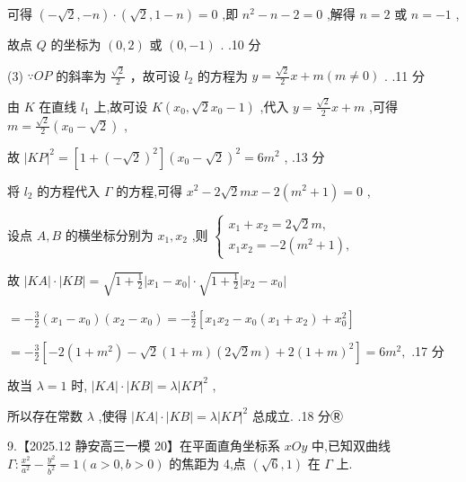 \documentclass[10pt]{article}
\begin{document}
可得 \(\left( {-\sqrt{2}, - n}\right)  \cdot  \left( {\sqrt{2},1 - n}\right)  = 0\) ,即 \({n}^{2} - n - 2 = 0\) ,解得 \(n = 2\) 或 \(n =  - 1\) ,

故点 \(Q\) 的坐标为 \(\left( {0,2}\right)\) 或 \(\left( {0, - 1}\right)\) . .10 分

(3) \(\because {OP}\) 的斜率为 \(\frac{\sqrt{2}}{2}\) ，故可设 \({l}_{2}\) 的方程为 \(y = \frac{\sqrt{2}}{2}x + m\left( {m \neq  0}\right)\) . .11 分

由 \(K\) 在直线 \({l}_{1}\) 上,故可设 \(K\left( {{x}_{0},\sqrt{2}{x}_{0} - 1}\right)\) ,代入 \(y = \frac{\sqrt{2}}{2}x + m\) ,可得 \(m = \frac{\sqrt{2}}{2}\left( {{x}_{0} - \sqrt{2}}\right)\) ,

故 \({\left| KP\right| }^{2} = \left\lbrack  {1 + {\left( -\sqrt{2}\right) }^{2}}\right\rbrack  {\left( {x}_{0} - \sqrt{2}\right) }^{2} = 6{m}^{2}\) , .13 分

将 \({l}_{2}\) 的方程代入 \(\Gamma\) 的方程,可得 \({x}^{2} - 2\sqrt{2}{mx} - 2\left( {{m}^{2} + 1}\right)  = 0\) ,

设点 \(A,B\) 的横坐标分别为 \({x}_{1},{x}_{2}\) ,则 \(\left\{  \begin{matrix} {x}_{1} + {x}_{2} = 2\sqrt{2}m, \\  {x}_{1}{x}_{2} =  - 2\left( {{m}^{2} + 1}\right) , \end{matrix}\right.\)

故 \(\left| {KA}\right|  \cdot  \left| {KB}\right|  = \sqrt{1 + \frac{1}{2}}\left| {{x}_{1} - {x}_{0}}\right|  \cdot  \sqrt{1 + \frac{1}{2}}\left| {{x}_{2} - {x}_{0}}\right|\)

\(=  - \frac{3}{2}\left( {{x}_{1} - {x}_{0}}\right) \left( {{x}_{2} - {x}_{0}}\right)  =  - \frac{3}{2}\left\lbrack  {{x}_{1}{x}_{2} - {x}_{0}\left( {{x}_{1} + {x}_{2}}\right)  + {x}_{0}^{2}}\right\rbrack\)

\(=  - \frac{3}{2}\left\lbrack  {-2\left( {1 + {m}^{2}}\right)  - \sqrt{2}\left( {1 + m}\right) \left( {2\sqrt{2}m}\right)  + 2{\left( 1 + m\right) }^{2}}\right\rbrack   = 6{m}^{2},\) .17 分

故当 \(\lambda  = 1\) 时, \(\left| {KA}\right|  \cdot  \left| {KB}\right|  = \lambda {\left| KP\right| }^{2}\) ,

所以存在常数 \(\lambda\) ,使得 \(\left| {KA}\right|  \cdot  \left| {KB}\right|  = \lambda {\left| KP\right| }^{2}\) 总成立. .18 分Ⓡ

9.【2025.12 静安高三一模 20】在平面直角坐标系 \({xOy}\) 中,已知双曲线 \(\Gamma  : \frac{{x}^{2}}{{a}^{2}} - \frac{{y}^{2}}{{b}^{2}} = 1\left( {a > 0,b > 0}\right)\) 的焦距为 4,点 \(\left( {\sqrt{6},1}\right)\) 在 \(\Gamma\) 上.
\end{document}
